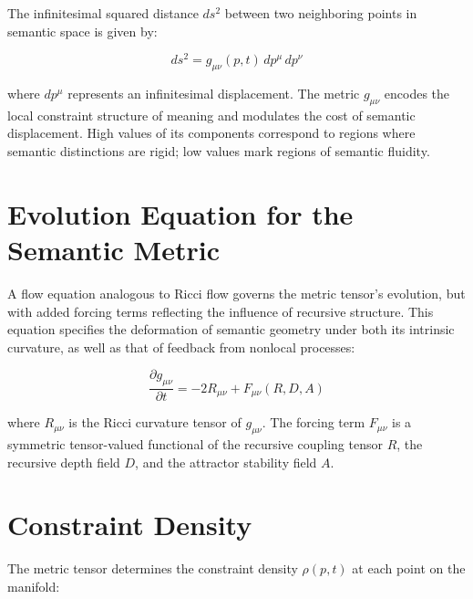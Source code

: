 The infinitesimal squared distance \(ds^2\) between two neighboring points in semantic space is given by:

\begin{equation}
ds^2 = g_{\mu\nu}(p, t) \, dp^\mu \, dp^\nu
\end{equation}

where \(dp^\mu\) represents an infinitesimal displacement. The metric \(g_{\mu\nu}\) encodes the local constraint structure of meaning and modulates the cost of semantic displacement. High values of its components correspond to regions where semantic distinctions are rigid; low values mark regions of semantic fluidity.


\section{Evolution Equation for the Semantic Metric}
\label{3.3:evolution_equation_for_the_semantic_metric}

A flow equation analogous to Ricci flow \autocite{Hamilton1982, Perelman2002, RicciLeviCivita1901} governs the metric tensor's evolution, but with added forcing terms reflecting the influence of recursive structure. This equation specifies the deformation of semantic geometry under both its intrinsic curvature, as well as that of feedback from nonlocal processes:

\begin{equation}\label{eq:metric_evolution}
\frac{\partial g_{\mu\nu}}{\partial t} = -2 R_{\mu\nu} + F_{\mu\nu}(R, D, A)
\end{equation}

where \(R_{\mu\nu}\) is the Ricci curvature tensor of \(g_{\mu\nu}\). The forcing term \(F_{\mu\nu}\) is a symmetric tensor-valued functional of the recursive coupling tensor \(R\), the recursive depth field \(D\), and the attractor stability field \(A\).


\section{Constraint Density}
\label{3.4:constraint_density}

The metric tensor determines the constraint density \(\rho(p, t)\) at each point on the manifold:

